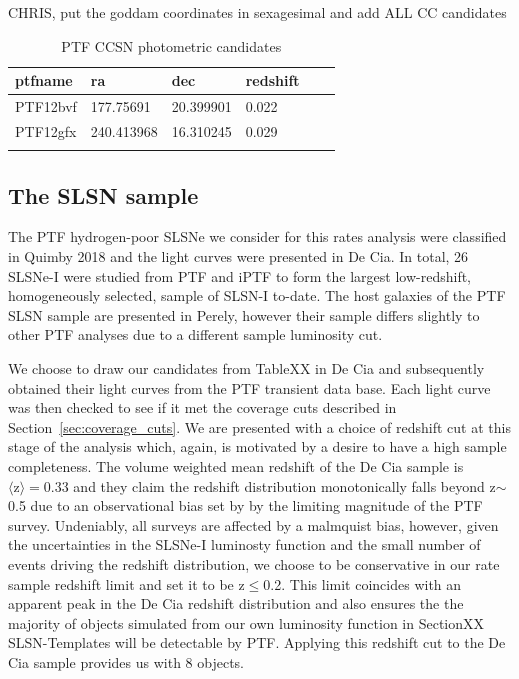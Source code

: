 \documentclass[a4paper,fleqn,usenatbib]{mnras}
\newcommand{\chris}[1]{\color{orange}#1\color{black}}
\begin{document}
\begin{table}
    \caption{PTF CCSN photometric candidates }
    \centering
    \chris{CHRIS, put the goddam coordinates in sexagesimal and add ALL CC candidates}\\
	\begin{tabular}{l l l l l l} 
		\hline

ptfname &     ra     &    dec     & redshift  \\
		\hline
 PTF12bvf   &  177.75691 &  20.399901 & 0.022  \\
 PTF12gfx   & 240.413968 &  16.310245 &    0.029 \\
 
 		\hline
		\label{tab:photCCproperties}
	\end{tabular}
 \end{table}


\subsection{The SLSN sample}
\label{SLSN_sample}

The PTF hydrogen-poor SLSNe we consider for this rates analysis were classified in \chris{Quimby 2018} and the light curves were presented in \chris{De Cia}. In total, 26 SLSNe-I were studied from PTF and iPTF to form the largest low-redshift, homogeneously selected, sample of SLSN-I to-date. The host galaxies of the PTF SLSN sample are presented in \chris{Perely}, however their sample differs slightly to other PTF analyses due to a different sample luminosity cut. 

We choose to draw our candidates from TableXX in \chris{De Cia} and subsequently obtained their light curves from the PTF transient data base. Each light curve was then checked to see if it met the coverage cuts described in Section~\ref{sec:coverage_cuts}. We are presented with a choice of redshift cut at this stage of the analysis which, again, is motivated by a desire to have a high sample completeness. The volume weighted mean redshift of the \chris{De Cia} sample is $\langle \mathrm{z} \rangle = 0.33$ and they claim the redshift distribution monotonically falls beyond z${\sim}$0.5 due to an observational bias set by by the limiting magnitude of the PTF survey. Undeniably, all surveys are affected by a malmquist bias, however, given the uncertainties in the SLSNe-I luminosty function and the small number of events driving the redshift distribution, we choose to be conservative in our rate sample redshift limit and set it to be z${\le}$0.2. This limit coincides with an apparent peak in the \chris{De Cia} redshift distribution and also ensures the the majority of objects simulated from our own luminosity function in SectionXX \chris{SLSN-Templates} will be detectable by PTF. Applying this redshift cut to the \chris{De Cia} sample provides us with 8 objects.
\end{document}
